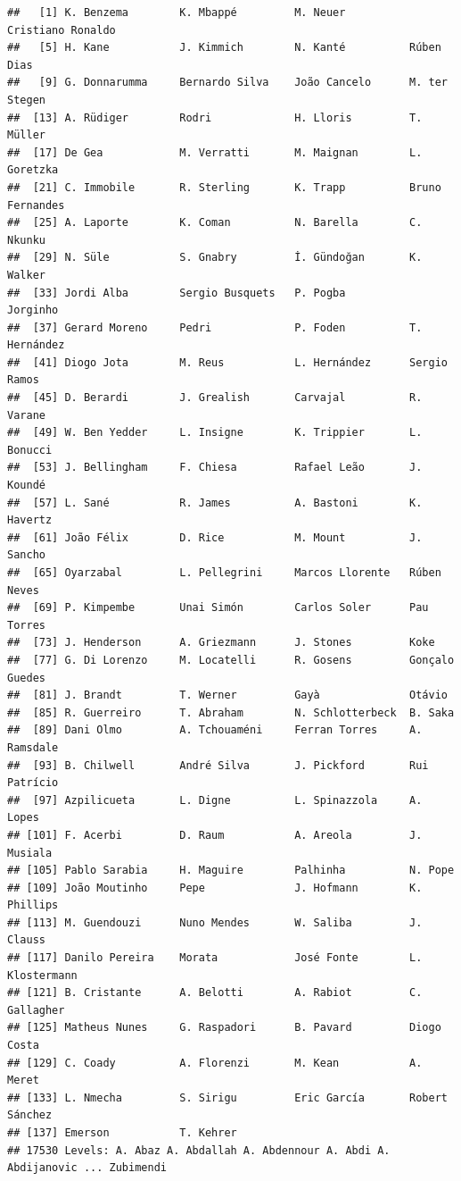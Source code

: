 \documentclass[
]{article}
\begin{document}
\begin{verbatim}
##   [1] K. Benzema        K. Mbappé         M. Neuer          Cristiano Ronaldo
##   [5] H. Kane           J. Kimmich        N. Kanté          Rúben Dias       
##   [9] G. Donnarumma     Bernardo Silva    João Cancelo      M. ter Stegen    
##  [13] A. Rüdiger        Rodri             H. Lloris         T. Müller        
##  [17] De Gea            M. Verratti       M. Maignan        L. Goretzka      
##  [21] C. Immobile       R. Sterling       K. Trapp          Bruno Fernandes  
##  [25] A. Laporte        K. Coman          N. Barella        C. Nkunku        
##  [29] N. Süle           S. Gnabry         İ. Gündoğan       K. Walker        
##  [33] Jordi Alba        Sergio Busquets   P. Pogba          Jorginho         
##  [37] Gerard Moreno     Pedri             P. Foden          T. Hernández     
##  [41] Diogo Jota        M. Reus           L. Hernández      Sergio Ramos     
##  [45] D. Berardi        J. Grealish       Carvajal          R. Varane        
##  [49] W. Ben Yedder     L. Insigne        K. Trippier       L. Bonucci       
##  [53] J. Bellingham     F. Chiesa         Rafael Leão       J. Koundé        
##  [57] L. Sané           R. James          A. Bastoni        K. Havertz       
##  [61] João Félix        D. Rice           M. Mount          J. Sancho        
##  [65] Oyarzabal         L. Pellegrini     Marcos Llorente   Rúben Neves      
##  [69] P. Kimpembe       Unai Simón        Carlos Soler      Pau Torres       
##  [73] J. Henderson      A. Griezmann      J. Stones         Koke             
##  [77] G. Di Lorenzo     M. Locatelli      R. Gosens         Gonçalo Guedes   
##  [81] J. Brandt         T. Werner         Gayà              Otávio           
##  [85] R. Guerreiro      T. Abraham        N. Schlotterbeck  B. Saka          
##  [89] Dani Olmo         A. Tchouaméni     Ferran Torres     A. Ramsdale      
##  [93] B. Chilwell       André Silva       J. Pickford       Rui Patrício     
##  [97] Azpilicueta       L. Digne          L. Spinazzola     A. Lopes         
## [101] F. Acerbi         D. Raum           A. Areola         J. Musiala       
## [105] Pablo Sarabia     H. Maguire        Palhinha          N. Pope          
## [109] João Moutinho     Pepe              J. Hofmann        K. Phillips      
## [113] M. Guendouzi      Nuno Mendes       W. Saliba         J. Clauss        
## [117] Danilo Pereira    Morata            José Fonte        L. Klostermann   
## [121] B. Cristante      A. Belotti        A. Rabiot         C. Gallagher     
## [125] Matheus Nunes     G. Raspadori      B. Pavard         Diogo Costa      
## [129] C. Coady          A. Florenzi       M. Kean           A. Meret         
## [133] L. Nmecha         S. Sirigu         Eric García       Robert Sánchez   
## [137] Emerson           T. Kehrer        
## 17530 Levels: A. Abaz A. Abdallah A. Abdennour A. Abdi A. Abdijanovic ... Zubimendi
\end{verbatim}
\end{document}
